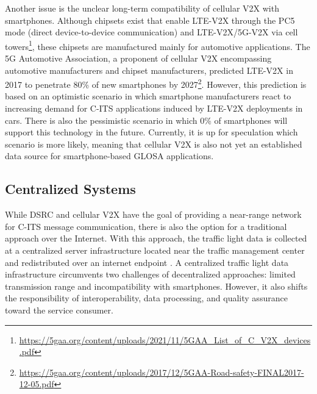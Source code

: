 Another issue is the unclear long-term compatibility of cellular V2X with smartphones. Although chipsets exist that enable LTE-V2X through the PC5 mode (direct device-to-device communication) and LTE-V2X/5G-V2X via cell towers\footnote{\url{https://5gaa.org/content/uploads/2021/11/5GAA_List_of_C_V2X_devices.pdf}}, these chipsets are manufactured mainly for automotive applications. The 5G Automotive Association, a proponent of cellular V2X encompassing automotive manufacturers and chipset manufacturers, predicted LTE-V2X in 2017 to penetrate 80\% of new smartphones by 2027\footnote{\url{https://5gaa.org/content/uploads/2017/12/5GAA-Road-safety-FINAL2017-12-05.pdf}}. However, this prediction is based on an optimistic scenario in which smartphone manufacturers react to increasing demand for C-ITS applications induced by LTE-V2X deployments in cars. There is also the pessimistic scenario in which 0\% of smartphones will support this technology in the future. Currently, it is up for speculation which scenario is more likely, meaning that cellular V2X is also not yet an established data source for smartphone-based GLOSA applications.

\subsection{Centralized Systems}

While DSRC and cellular V2X have the goal of providing a near-range network for C-ITS message communication, there is also the option for a traditional approach over the Internet. With this approach, the traffic light data is collected at a centralized server infrastructure located near the traffic management center and redistributed over an internet endpoint \cite{zweck_traffic_2013, protschky_extensive_2014, protschky_adaptive_2014}. A centralized traffic light data infrastructure circumvents two challenges of decentralized approaches: limited transmission range and incompatibility with smartphones. However, it also shifts the responsibility of interoperability, data processing, and quality assurance toward the service consumer.

